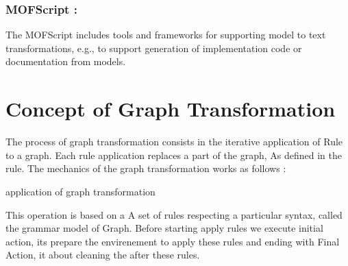 \subsubsection{MOFScript :} 
The MOFScript includes tools and frameworks for supporting model to text transformations, e.g., to support generation of implementation code or documentation from models\cite{ch3lang}.

\pagebreak


\section{Concept of Graph Transformation} 
The process of graph transformation consists in the iterative application of
Rule to a graph. Each rule application replaces a part of the graph, As defined in the rule. 
The mechanics of the graph transformation works as follows : 

\vspace{1cm}
\begin{algorithm}
\SetAlgoLined


 
 \caption{application of graph transformation}
\end{algorithm}

\vspace{0.5cm}
 
This operation is based on a A set of rules respecting a particular 
syntax, called the grammar model of Graph.
Before starting apply rules we execute initial action, 
its prepare the envirenement to apply these rules
and ending with Final Action, it about cleaning the after these rules\cite{ch3-bid, ch3-spec}.



